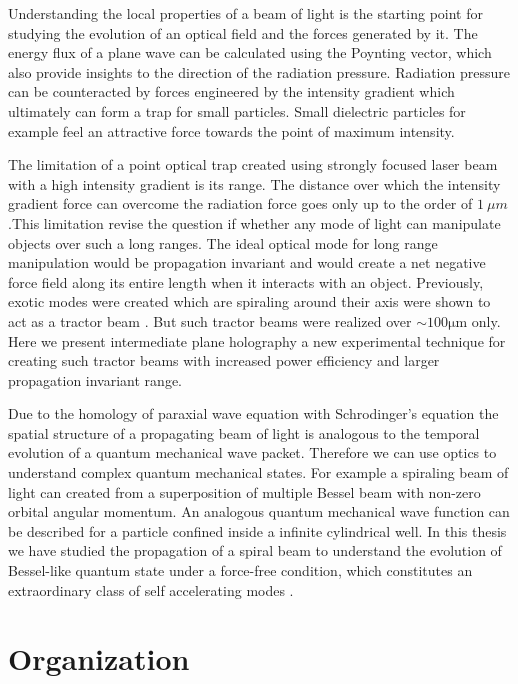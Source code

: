 Understanding the local properties of a beam of light is the starting point for studying the evolution of an optical field and the forces generated by it. The energy flux of a plane wave can be calculated using the Poynting vector, which also provide insights to the direction of the radiation pressure. Radiation pressure can be counteracted by forces engineered by the intensity gradient which ultimately can form a trap for small particles. Small dielectric particles for example feel an attractive force towards the point of maximum intensity.


The limitation of a point optical trap created using strongly focused laser beam with a high intensity gradient is its range. The distance over which the intensity gradient force can overcome the radiation force goes only up to the order of $\SI{1}{\mu m}$.This limitation revise the question if whether any mode of light  can manipulate objects over such a long ranges. The ideal optical mode for long range manipulation would be propagation invariant  and would create a net negative force field along its entire length when it interacts with an object. Previously, exotic modes were created which are spiraling around their axis were shown to act as a tractor beam \cite{Lee_2010}. But such tractor beams were realized over $\sim 100 \mathrm{\mu m}$ only. Here we present intermediate plane holography a new experimental technique for creating such tractor beams with increased power efficiency and larger propagation invariant range.


Due to the homology of paraxial wave equation with Schrodinger's equation the spatial structure of a propagating beam of light is analogous to the temporal evolution of a quantum mechanical wave packet. Therefore we can use optics to understand complex quantum mechanical states. For example a spiraling beam of light can created from a superposition of multiple Bessel beam with non-zero orbital angular momentum. An analogous quantum mechanical wave function can be described for a particle confined inside a infinite cylindrical well. In this thesis we have studied the propagation of a spiral beam to understand the evolution of  Bessel-like quantum state under a force-free condition, which constitutes an extraordinary class of self accelerating modes \cite{Berry1979}.



\section{Organization}

